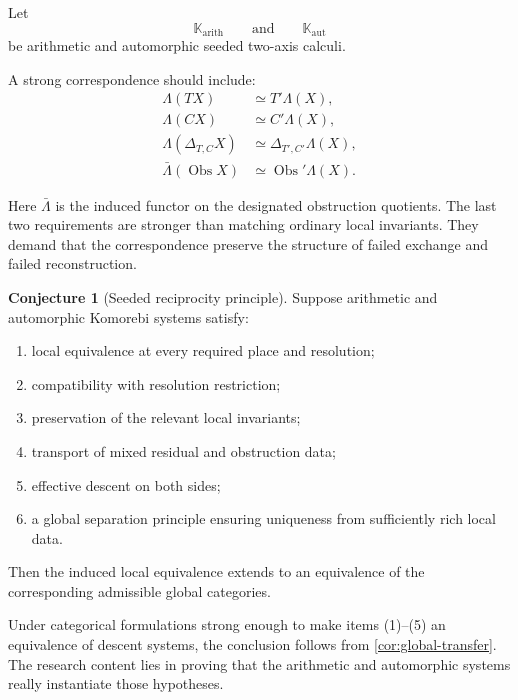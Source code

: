 \documentclass[11pt]{article}
\theoremstyle{definition}
\newtheorem{conjecture}[theorem]{Conjecture}
\theoremstyle{remark}
\newcommand{\Obs}{\operatorname{Obs}}
\begin{document}
Let
\[
\mathbb K_{\mathrm{arith}}
\qquad\text{and}\qquad
\mathbb K_{\mathrm{aut}}
\]
be arithmetic and automorphic seeded two-axis calculi.

A strong correspondence should include:
\begin{align*}
\Lambda(TX)&\simeq T'\Lambda(X),\\
\Lambda(CX)&\simeq C'\Lambda(X),\\
\Lambda(\Delta_{T,C}X)&\simeq\Delta_{T',C'}\Lambda(X),\\
\bar\Lambda(\Obs X)&\simeq\Obs'\Lambda(X).
\end{align*}

Here $\bar\Lambda$ is the induced functor on the designated obstruction quotients. The last two requirements are stronger than matching ordinary local invariants. They demand that the correspondence preserve the structure of failed exchange and failed reconstruction.

\begin{conjecture}[Seeded reciprocity principle]\label{conj:seeded-reciprocity}
Suppose arithmetic and automorphic Komorebi systems satisfy:
\begin{enumerate}
    \item local equivalence at every required place and resolution;
    \item compatibility with resolution restriction;
    \item preservation of the relevant local invariants;
    \item transport of mixed residual and obstruction data;
    \item effective descent on both sides;
    \item a global separation principle ensuring uniqueness from sufficiently rich local data.
\end{enumerate}
Then the induced local equivalence extends to an equivalence of the corresponding admissible global categories.
\end{conjecture}

Under categorical formulations strong enough to make items (1)--(5) an equivalence of descent systems, the conclusion follows from \cref{cor:global-transfer}. The research content lies in proving that the arithmetic and automorphic systems really instantiate those hypotheses.
\end{document}
